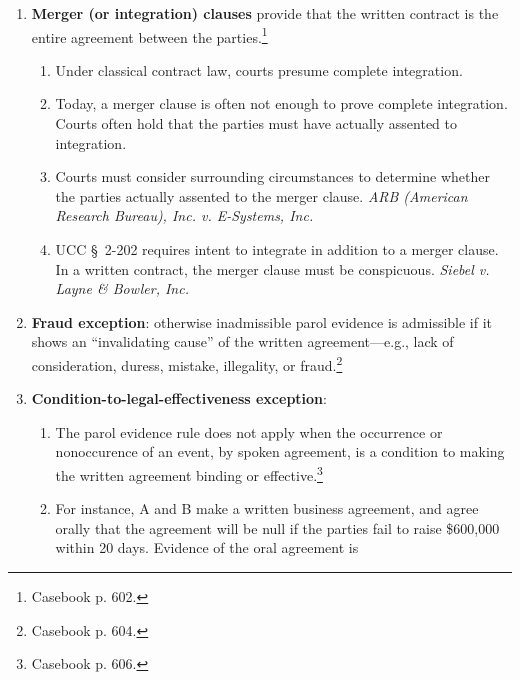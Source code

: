 \begin{enumerate}
\begin{enumerate}
        \item The \emph{Hunt Foods} view of consistency is too narrow. A 
        better definition is ``the absence of reasonable harmony in terms of 
        the language and respective obligations of the 
        parties.''\footnote{Casebook p. 601.} \emph{Alaska Northern 
        Development, Inc. v. Alyeska Pipeline Service Co.}
    \end{enumerate}
    \item \textbf{Merger (or integration) clauses} provide that the written 
    contract is the entire agreement between the parties.\footnote{Casebook p. 
    602.}
    \begin{enumerate}
        \item Under classical contract law, courts presume complete 
        integration.
        \item Today, a merger clause is often not enough to prove complete 
        integration. Courts often hold that the parties must have actually 
        assented to integration.
        \item Courts must consider surrounding circumstances to determine 
        whether the parties actually assented to the merger clause. \emph{ARB 
        (American Research Bureau), Inc. v. E-Systems, Inc.}
        \item UCC \S\ 2-202 requires intent to integrate in addition to a 
        merger clause. In a written contract, the merger clause must be 
        conspicuous. \emph{Siebel v. Layne \& Bowler, Inc.}
    \end{enumerate}
    \item \textbf{Fraud exception}: otherwise inadmissible parol evidence is 
    admissible if it shows an ``invalidating cause'' of the written 
    agreement---e.g., lack of consideration, duress, mistake, illegality, or 
    fraud.\footnote{Casebook p. 604.}
    \item \textbf{Condition-to-legal-effectiveness exception}: 
    \begin{enumerate}
        \item The parol evidence rule does not apply when the occurrence or 
        nonoccurence of an event, by spoken agreement, is a condition to 
        making the written agreement binding or effective.\footnote{Casebook 
        p. 606.}
        \item For instance, A and B make a written business agreement, and 
        agree orally that the agreement will be null if the parties fail to 
        raise \$600,000 within 20 days. Evidence of the oral agreement is 

\end{enumerate}
\end{enumerate}

